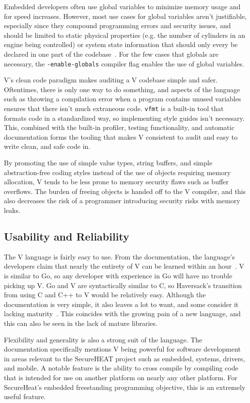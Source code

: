 \documentclass[letterpaper,twocolumn,10pt]{article}
\begin{document}
Embedded developers often use global variables to minimize memory usage and for speed increases. However, most use cases for global variables aren't justifiable, especially since they compound programming errors and security issues, and should be limited to static physical properties (e.g. the number of cylinders in an engine being controlled) or system state information that should only every be declared in one part of the codebase~\cite{embedded}. For the few cases that globals are necessary, the \texttt{-enable-globals} compiler flag enables the use of global variables.

V's clean code paradigm makes auditing a V codebase simple and safer. Oftentimes, there is only one way to do something, and aspects of the language such as throwing a compilation error when a program contains unused variables ensures that there isn't much extraneous code. \texttt{vfmt} is a built-in tool that formats code in a standardized way, so implementing style guides isn't necessary. This, combined with the built-in profiler, testing functionality, and automatic documentation forms the tooling that makes V consistent to audit and easy to write clean, and safe code in.

By promoting the use of simple value types, string buffers, and simple abstraction-free coding styles instead of the use of objects requiring memory allocation, V tends to be less prone to memory security flaws such as buffer overflows. The burden of freeing objects is handed off to the V compiler, and this also decreases the risk of a programmer introducing security risks with memory leaks.

\subsection{Usability and Reliability}
The V language is fairly easy to use. From the documentation, the language's developers claim that nearly the entirety of V can be learned within an hour~\cite{vdocs}. V is similar to Go, so any developer with experience in Go will have no trouble picking up V. Go and V are syntactically similar to C, so Haversack's transition from using C and C++ to V would be relatively easy. Although the documentation is very simple, it also leaves a lot to want, and some consider it lacking maturity~\cite{JamesB}. This coincides with the growing pain of a new language, and this can also be seen in the lack of mature libraries.

Flexibility and generality is also a strong suit of the language. The documentation specifically mentions V being powerful for software development in areas relevant to the SecureHEAT project such as embedded, systems, drivers, and mobile. A notable feature is the ability to cross compile by compiling code that is intended for use on another platform on nearly any other platform. For SecureHeat's embedded freestanding programming objective, this is an extremely useful feature.
\end{document}
